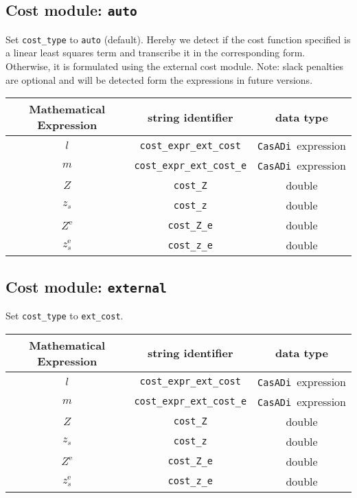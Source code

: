 \documentclass{article}
\newcommand{\code}[1]{\texttt{#1}}
\newcommand{\casadi}{\texttt{CasADi}}
\newcommand{\terminal}{^{\textrm{e}}}
\begin{document}
\subsection*{Cost module: \code{auto}}
Set \code{cost\_type} to \code{auto} (default).
Hereby we detect if the cost function specified is a linear least squares term and transcribe it in the corresponding form.
Otherwise, it is formulated using the external cost module.
Note: slack penalties are optional and will be detected form the expressions in future versions.
\begin{table}[h!]
	\centering
	\begin{tabular}{|c|c|c|}
		\toprule
		Mathematical Expression                    & string identifier & data type \\ \midrule
		$ l $ & \code{cost\_expr\_ext\_cost}    & \casadi~expression    \\ \midrule
		$ m $ & \code{cost\_expr\_ext\_cost\_e}    & \casadi~expression    \\ \midrule
		$ Z $ & \code{cost\_Z}    & double    \\ \midrule
		$ z_s $ & \code{cost\_z}    & double    \\ \midrule
		$ Z\terminal $ & \code{cost\_Z\_e}    & double    \\ \midrule
		$ z_s\terminal $ & \code{cost\_z\_e}    & double    \\
		\bottomrule
	\end{tabular}
\end{table}

\subsection*{Cost module: \code{external}}
Set \code{cost\_type} to \code{ext\_cost}. %
\begin{table}[h!]
	\centering
	\begin{tabular}{|c|c|c|}
		\toprule
		Mathematical Expression                    & string identifier & data type \\ \midrule
		$ l $ & \code{cost\_expr\_ext\_cost}    & \casadi~expression    \\ \midrule
		$ m $ & \code{cost\_expr\_ext\_cost\_e}    & \casadi~expression    \\ \midrule
		$ Z $ & \code{cost\_Z}    & double    \\ \midrule
		$ z_s $ & \code{cost\_z}    & double    \\ \midrule
		$ Z\terminal $ & \code{cost\_Z\_e}    & double    \\ \midrule
		$ z_s\terminal $ & \code{cost\_z\_e}    & double    \\
		\bottomrule
	\end{tabular}
\end{table}
\end{document}
